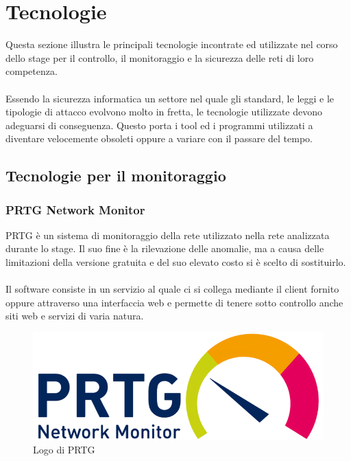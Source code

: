 \documentclass[Tesi.tex]{subfiles}
\begin{document}
\chapter{Tecnologie}

Questa sezione illustra le principali tecnologie incontrate ed utilizzate nel corso dello stage per il controllo, il monitoraggio e la sicurezza delle reti di loro competenza. \\\\
Essendo la sicurezza informatica un settore nel quale gli standard, le leggi e le tipologie di attacco evolvono molto in fretta, le tecnologie utilizzate devono adeguarsi di conseguenza. Questo porta i tool ed i programmi utilizzati a diventare velocemente obsoleti oppure a variare con il passare del tempo.

\section{Tecnologie per il monitoraggio}
\subsection{PRTG Network Monitor}
PRTG è un sistema di monitoraggio della rete utilizzato nella rete analizzata durante lo stage. Il suo fine è la rilevazione delle anomalie, ma a causa delle limitazioni della versione gratuita e del suo elevato costo si è scelto di sostituirlo.\\\\
Il software consiste in un servizio al quale ci si collega mediante il client fornito oppure attraverso una interfaccia web e permette di tenere sotto controllo anche siti web e servizi di varia natura.
\begin{figure}[H]
	\centering
	\includegraphics[width=0.5\linewidth]{"images/logo/PRTG_logo"}
	\caption{Logo di PRTG}
	\label{fig:Logo di PRTG}
\end{figure}
\end{document}

